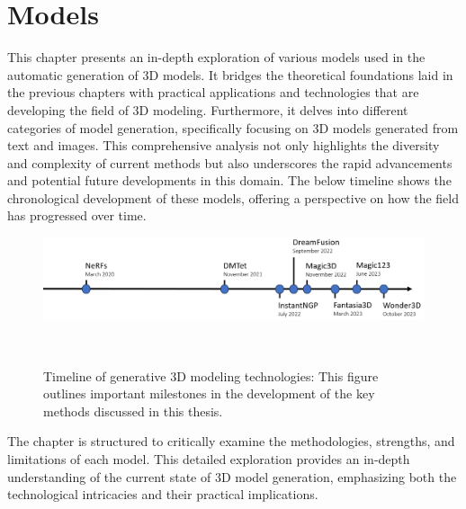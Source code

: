 \chapter{Models}\label{ch:models}

This chapter presents an in-depth exploration of various models used in the automatic generation of 3D models. It bridges the theoretical foundations laid in the previous chapters with practical applications and technologies that are developing the field of 3D modeling. Furthermore, it delves into different categories of model generation, specifically focusing on 3D models generated from text and images. This comprehensive analysis not only highlights the diversity and complexity of current methods but also underscores the rapid advancements and potential future developments in this domain. The below timeline shows the chronological development of these models, offering a perspective on how the field has progressed over time.

\begin{figure}[H]
    \centering
      \includegraphics[width=\textwidth]{figures/timelineMethods.png}
      \caption{Timeline of generative 3D modeling technologies: This figure outlines important milestones in the development of the key methods discussed in this thesis.}~\label{fig:timelineMethods}
\end{figure}

The chapter is structured to critically examine the methodologies, strengths, and limitations of each model. This detailed exploration provides an in-depth understanding of the current state of 3D model generation, emphasizing both the technological intricacies and their practical implications.



